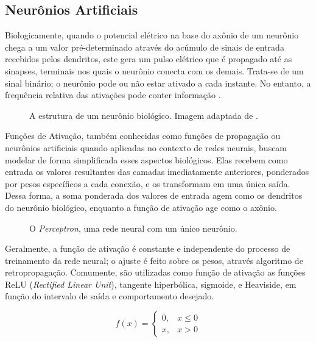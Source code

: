 \subsection{Neurônios Artificiais}

Biologicamente, quando o potencial elétrico na base do axônio de um neurônio chega a um valor pré-determinado através do acúmulo de sinais de entrada recebidos pelos dendritos, este gera um pulso elétrico que é propagado até as sinapses, terminais nos quais o neurônio conecta com os demais.
Trata-se de um sinal binário; o neurônio pode ou não estar ativado a cada instante. No entanto, a frequência relativa das ativações pode conter informação \cite{behnkeHierarchicalNeuralNetworks2003}.

\begin{figure}[H]
    \centering
    
    \caption{A estrutura de um neurônio biológico. Imagem adaptada de \cite{dhp1080IdoSkemoPri2016}.}
    \label{fig:bio_neuron}
\end{figure}

Funções de Ativação, também conhecidas como funções de propagação ou neurônios artificiais quando aplicadas no contexto de redes neurais, buscam modelar de forma simplificada esses aspectos biológicos.
Elas recebem como entrada os valores resultantes das camadas imediatamente anteriores, ponderados por pesos específicos a cada conexão, e os transformam em uma única saída.
Dessa forma, a soma ponderada dos valores de entrada agem como os dendritos do neurônio biológico, enquanto a função de ativação age como o axônio.

\begin{figure}[H]
    \centering
    
    \caption{O \textit{Perceptron}, uma rede neural com um único neurônio.}
    \label{fig:perceptron}
\end{figure}

Geralmente, a função de ativação é constante e independente do processo de treinamento da rede neural; o ajuste é feito sobre os pesos, através algoritmo de retropropagação.
Comumente, são utilizadas como função de ativação as funções ReLU (\textit{Rectified Linear Unit}), tangente hiperbólica, sigmoide, e Heaviside, em função do intervalo de saída e comportamento desejado.

\begin{equation}\label{eq:relu}
    f(x) = \left\{
        \begin{array}{ll}
            0, & x \le 0\\
            x, & x > 0
        \end{array}
    \right.
\end{equation}

